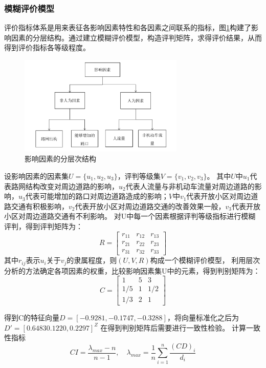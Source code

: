 \documentclass[fontset=windows,a4paper,12pt]{ctexart}
\begin{document}
		\subsubsection{模糊评价模型}
			评价指标体系是用来表征各影响因素特性和各因素之间联系的指标，图\ref{fig:layer_struct}构建了影响因素的分层结构。通过建立模糊评价模型，构造评判矩阵，求得评价结果，从而得到评价指标各等级程度。
			\begin{figure}[!htbp]
				\centering
				\includegraphics[width=0.7\textwidth]{pic/judge_result.pdf}
				\caption{影响因素的分层次结构}
				\label{fig:layer_struct}
			\end{figure}
			设影响因素的因素集$ U=\{u_1,u_2,u_3\} $，评判等级集$ V=\{v_1,v_2,v_3\} $。
			其中$ U $中$ u_1 $代表路网结构改变对周边道路的影响，$ u_2 $代表人流量与非机动车流量对周边道路的影响，$ u_3 $代表可能增加的路口对周边道路造成的影响；$ V $中$ v_1 $代表开放小区对周边道路交通有积极影响，$ v_2 $代表开放小区对周边道路交通的改善效果一般，$ v_3 $代表开放小区对周边道路交通有不利影响。
			对U中每一个因素根据评判等级指标进行模糊评判，得到评判矩阵为：
			$$
				R=\left[
				\begin{array}{cccc}
					r_{11} & r_{12} & r_{13}\\
					r_{21} & r_{22} & r_{23}\\
					r_{31} & r_{32} & r_{33}
				\end{array}
				\right]
			$$
			其中$ r_{ij} $表示$ u_i $关于$ v_j $的隶属程度，则$ (U,V,R) $构成一个模糊评价模型，
			利用层次分析的方法确定各项因素的权重，比较影响因素集U中的元素，得到判别矩阵为：
			$$
				C=\left[
				\begin{array}{cccc}
					1 & 5 & 3\\
					1/5 & 1 & 1/2\\
					1/3 & 2 & 1
				\end{array}
				\right]
			$$
			
			得到C的特征向量$ D=[-0.9281,-0.1747,-0.3288] $，将向量标准化之后为$ D'=[0.6483 0.1220,0.2297]^Z $
			在得到判别矩阵后需要进行一致性检验。
			计算一致性指标
			$$CI=\frac{\lambda_{max}-n}{n-1},\quad\lambda_{max}=\frac{1}{n}\sum\limits_{i=1}^{n}\frac{(CD)_i}{d_i}$$
			
\end{document}
